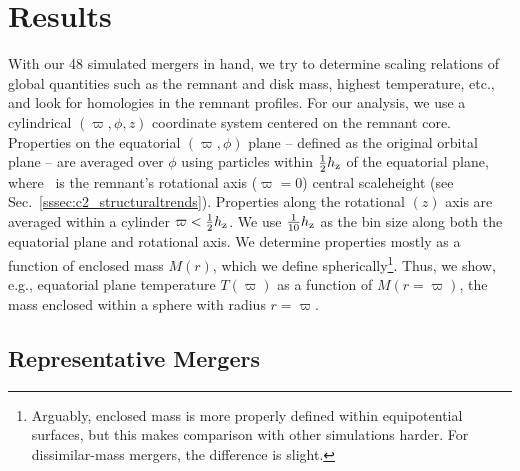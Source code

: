\section{Results}
\label{sec:c2_results}

With our 48 simulated mergers in hand, we try to determine scaling relations of global quantities such as the remnant and disk mass, highest temperature, etc., and look for homologies in the remnant profiles.  For our analysis, we use a cylindrical $(\varpi,\phi,z)$ coordinate system centered on the remnant core.  Properties on the equatorial $(\varpi,\phi)$ plane -- defined as the original orbital plane -- are averaged over $\phi$ using particles within $\frac{1}{2}\hz$ of the equatorial plane, where \hz\ is the remnant's rotational axis ($\varpi = 0$) central scaleheight (see Sec.~\ref{sssec:c2_structuraltrends}).  Properties along the rotational $(z)$ axis are averaged within a cylinder $\varpi<\frac{1}{2}\hz$.  We use $\frac{1}{10}\hz$ as the bin size along both the equatorial plane and rotational axis.  We determine properties mostly as a function of enclosed mass $M(r)$, which we define spherically\footnote{Arguably, enclosed mass is more properly defined within equipotential surfaces, but this makes comparison with other simulations harder.  For dissimilar-mass mergers, the difference is slight.}.  Thus, we show, e.g., equatorial plane temperature $T(\varpi)$ as a function of $M(r=\varpi)$, the mass enclosed within a sphere with radius $r=\varpi$.

\subsection{Representative Mergers}
\label{ssec:c2_samplingofmergers}


